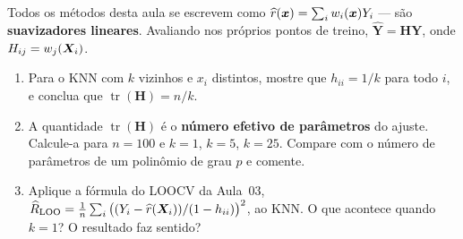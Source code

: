 \documentclass[11pt,a4paper]{article}
\begin{document}
\begin{exercicio}
Todos os métodos desta aula se escrevem como $\widehat{r}(\bm{x})=\sum_i w_i(\bm{x})Y_i$ ---
são \textbf{suavizadores lineares}. Avaliando nos próprios pontos de treino,
$\widehat{\bm Y}=\bm H\bm Y$, onde $H_{ij}=w_j(\bm{X}_i)$.
\begin{enumerate}[label=(\alph*),leftmargin=1.1cm]
  \item Para o KNN com $k$ vizinhos e $x_i$ distintos, mostre que $h_{ii}=1/k$
        para todo $i$, e conclua que $\operatorname{tr}(\bm H)=n/k$.
  \item A quantidade $\operatorname{tr}(\bm H)$ é o \textbf{número efetivo de
        parâmetros} do ajuste. Calcule-a para $n=100$ e $k=1$, $k=5$, $k=25$.
        Compare com o número de parâmetros de um polinômio de grau $p$ e comente.
  \item Aplique a fórmula do LOOCV da Aula~03,
        $\widehat{R}_{\text{LOO}}=\frac1n\sum_i\big((Y_i-\widehat{r}(\bm{X}_i))/(1-h_{ii})\big)^2$,
        ao KNN. O que acontece quando $k=1$? O resultado faz sentido?
\end{enumerate}
\end{exercicio}
\end{document}

